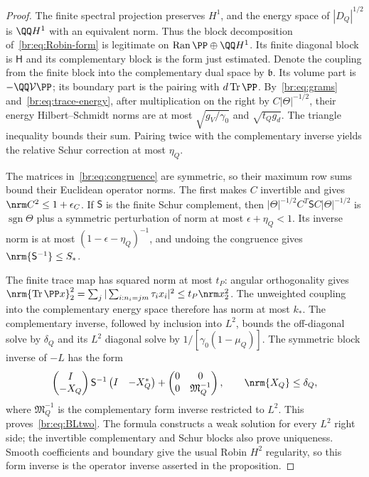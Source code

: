 \begin{proof}
The finite spectral projection preserves $H^1$, and the energy space
of $|D_Q|^{1/2}$ is $\QQ H^1$ with an equivalent norm. Thus the
block decomposition of~\eqref{br:eq:Robin-form} is legitimate on
$\operatorname{Ran}\PP\oplus\QQ H^1$. Its finite diagonal block is
$\mathsf H$ and its complementary block is the form just estimated.
Denote the coupling from the finite block into the complementary dual
space by $\mathfrak b$. Its volume part is $-\QQ\mathcal V\PP$; its
boundary part is the pairing with $d\operatorname{Tr}\PP$.
By~\eqref{br:eq:grams} and~\eqref{br:eq:trace-energy}, after multiplication
on the right by $C|\Theta|^{-1/2}$, their energy Hilbert--Schmidt norms
are at most $\sqrt{g_V/\gamma_0}$ and $\sqrt{t_Qg_d}$.
The triangle inequality bounds their sum. Pairing twice with the
complementary inverse yields the relative Schur correction at most
$\eta_Q$.

The matrices in~\eqref{br:eq:congruence} are symmetric, so their maximum
row sums bound their Euclidean operator norms. The first makes $C$
invertible and gives $\nrm C^2\le1+\epsilon_C$. If $\mathsf S$ is the
finite Schur complement, then
$|\Theta|^{-1/2}C^T\mathsf SC|\Theta|^{-1/2}$ is
$\operatorname{sgn}\Theta$ plus a symmetric perturbation of norm at
most $\epsilon+\eta_Q<1$. Its inverse norm is at most
$(1-\epsilon-\eta_Q)^{-1}$, and undoing the congruence gives
$\nrm{\mathsf S^{-1}}\le S_*$.

The finite trace map has squared norm at most $t_P$: angular
orthogonality gives
$\nrm{\operatorname{Tr}\PP x}_2^2
=\sum_j|\sum_{i:n_i=jm}\tau_ix_i|^2\le t_P\nrm x_2^2$.
The unweighted coupling into the complementary energy space therefore
has norm at most $k_*$. The complementary inverse, followed by inclusion
into $L^2$, bounds the off-diagonal solve by $\delta_Q$ and its
$L^2$ diagonal solve by $1/[\gamma_0(1-\mu_Q)]$.
The symmetric block inverse of $-L$ has the form
\[
 \begin{pmatrix}I\\-X_Q\end{pmatrix}\mathsf S^{-1}
 \begin{pmatrix}I&-X_Q^*\end{pmatrix}
 +\begin{pmatrix}0&0\\0&\mathfrak M_Q^{-1}\end{pmatrix},
 \qquad \nrm{X_Q}\le\delta_Q,
\]
where $\mathfrak M_Q^{-1}$ is the complementary form inverse restricted
to $L^2$. This proves~\eqref{br:eq:BLtwo}. The formula constructs a weak
solution for every $L^2$ right side; the invertible complementary and
Schur blocks also prove uniqueness. Smooth coefficients and boundary
give the usual Robin $H^2$ regularity, so this form inverse is the
operator inverse asserted in the proposition.
\end{proof}

